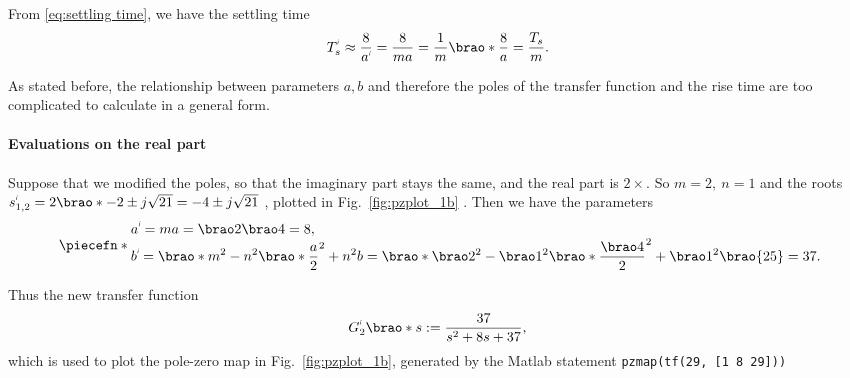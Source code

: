 \documentclass[12pt]{article}
\DeclarePairedDelimiter\brao()%
\DeclarePairedDelimiter\piecefn\{.
\newcommand{\setprime}[2][1]{%
    {#2}^{%
        \raisebox{1pt}{%
            \scalebox{0.5}{%
                \itshape\sffamily\uppercase%
                \expandafter{%
                    \romannumeral#1%
                }%
            }%
        }
    }%
}%
\begin{document}
\begin{enumerate}[(a)]
        From \eqref{eq:settling time}, we have the settling time
        \begin{equation}\label{eq:settling time, m, n}
            \setprime{T}_s \approx \frac8{\setprime{a}} = \frac8{ma} = \frac1m\brao*{\frac8{a}} = \frac{T_s}m.
        \end{equation}

        As stated before, the relationship between parameters $a, b$ and therefore the poles of the transfer function and the rise time are too complicated to calculate in a general form.

        \paragraph{Evaluations on the real part}

        Suppose that we modified the poles, so that the imaginary part stays the same, and the real part is $2\times$.
        So $m = 2,\ n = 1$
        and the roots $\setprime{s}_{1,2} = 2\brao*{-2} \pm j\sqrt{21} = -4 \pm j\sqrt{21}$%
        , plotted in Fig.~\ref{fig:pzplot_1b}%
        .
        Then we have the parameters
        \begin{equation}
            \piecefn*{
                \begin{array}{@{}l@{}}\displaystyle
                    \setprime{a} = ma = \brao2\brao4 = 8,
                \\*\displaystyle
                      \setprime{b}
                    = \brao*{m^2 - n^2}\brao*{\frac{a}2}^2 + n^2b
                    = \brao*{\brao2^2 - \brao1^2}\brao*{\frac{\brao4}2}^2 + \brao1^2\brao{25}
                    = 37\rlap.
                \end{array}
            }
        \end{equation}

        Thus the new transfer function
        \begin{equation}
            \setprime{G}_2\brao*s := \frac{37}{s^2 + 8s + 37},
        \end{equation}
        which is used to plot the pole-zero map in Fig.~\ref{fig:pzplot_1b}, generated by the Matlab statement \texttt{pzmap(tf(29, [1 8 29]))}


\end{enumerate}
\end{document}
